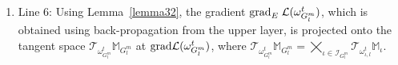 \documentclass[10pt,journal,compsoc]{IEEEtran}
\newcommand{\gr}{{\rm grad}}
\theoremstyle{definition}
\theoremstyle{definition}
\theoremstyle{remark}
\theoremstyle{remark}
\theoremstyle{remark}
\begin{document}
 
\begin{enumerate}[leftmargin=*]
	\item Line 6: Using Lemma~\ref{lemma32}, the gradient  $\gr_E \; \mathcal{L}(\omega_{G^m_l}^{t})$, which is obtained using back-propagation from the upper layer, is projected onto the tangent space $\mathcal{T}_{\omega^t_{G^m_l}} \mathbb{M}_{G^m_l}$ at $\gr \mathcal{L}(\omega_{G^m_l}^{t})$, where
	$\mathcal{T}_{\omega^t_{G^m_l}} \mathbb{M}_{G^m_l} = \bigtimes \limits _{\iota \in \mathcal{I}_{G^m_l}} \mathcal{T}_{\omega^t_{\iota,l}} \mathbb{M}_{\iota}$.


\end{enumerate}
\end{document}
